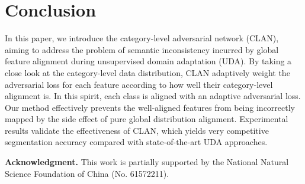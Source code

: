 \documentclass[10pt,twocolumn,letterpaper]{article}
\begin{document}
\section{Conclusion}
In this paper, we introduce the category-level adversarial network (CLAN), aiming to address the problem of semantic inconsistency incurred by global feature alignment during unsupervised domain adaptation (UDA). By taking a close look at the category-level data distribution, CLAN adaptively weight the adversarial loss for each feature according to how well their category-level alignment is. In this spirit, each class is aligned with an adaptive adversarial loss. Our method effectively prevents the well-aligned features from being incorrectly mapped by the side effect of pure global distribution alignment. Experimental results validate the effectiveness of CLAN, which yields very competitive segmentation accuracy compared with state-of-the-art UDA approaches.

\textbf{Acknowledgment.} This work is partially supported by the National Natural Science Foundation of China (No. 61572211).

{\small


}
\end{document}
